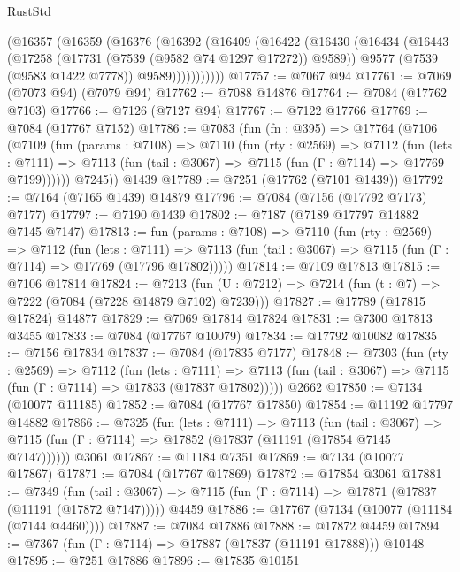 \begin{lexlean}{RustStd}
\begin{coremodule}
        (@16357
          (@16359
            (@16376
              (@16392
                (@16409
                  (@16422
                    (@16430
                      (@16434
                        (@16443
                          (@17258 (@17731 (@7539 (@9582 @74 @1297 @17272)) @9589))
                          @9577
                          (@7539 (@9583 @1422 @7778))
                          @9589)))))))))))
@17757 := @7067 @94
@17761 := @7069 (@7073 @94) (@7079 @94)
@17762 := @7088 @14876
@17764 := @7084 (@17762 @7103)
@17766 := @7126 (@7127 @94)
@17767 := @7122 @17766
@17769 := @7084 (@17767 @7152)
@17786 := @7083
    (fun (fn : @395) =>
    @17764
      (@7106
        (@7109
          (fun (params : @7108) =>
          @7110
            (fun (rty : @2569) =>
            @7112
              (fun (lets : @7111) =>
              @7113 (fun (tail : @3067) => @7115 (fun (Γ : @7114) => @17769 @7199))))))
        @7245))
    @1439
@17789 := @7251 (@17762 (@7101 @1439))
@17792 := @7164 (@7165 @1439) @14879
@17796 := @7084 (@7156 (@17792 @7173) @7177)
@17797 := @7190 @1439
@17802 := @7187 (@7189 @17797 @14882 @7145 @7147)
@17813 := fun (params : @7108) =>
  @7110
    (fun (rty : @2569) =>
    @7112
      (fun (lets : @7111) =>
      @7113 (fun (tail : @3067) => @7115 (fun (Γ : @7114) => @17769 (@17796 @17802)))))
@17814 := @7109 @17813
@17815 := @7106 @17814
@17824 := @7213
    (fun (U : @7212) => @7214 (fun (t : @7) => @7222 (@7084 (@7228 @14879 @7102) @7239)))
@17827 := @17789 (@17815 @17824) @14877
@17829 := @7069 @17814 @17824
@17831 := @7300 @17813 @3455
@17833 := @7084 (@17767 @10079)
@17834 := @17792 @10082
@17835 := @7156 @17834
@17837 := @7084 (@17835 @7177)
@17848 := @7303
    (fun (rty : @2569) =>
    @7112
      (fun (lets : @7111) =>
      @7113 (fun (tail : @3067) => @7115 (fun (Γ : @7114) => @17833 (@17837 @17802)))))
    @2662
@17850 := @7134 (@10077 @11185)
@17852 := @7084 (@17767 @17850)
@17854 := @11192 @17797 @14882
@17866 := @7325
    (fun (lets : @7111) =>
    @7113
      (fun (tail : @3067) =>
      @7115 (fun (Γ : @7114) => @17852 (@17837 (@11191 (@17854 @7145 @7147))))))
    @3061
@17867 := @11184 @7351
@17869 := @7134 (@10077 @17867)
@17871 := @7084 (@17767 @17869)
@17872 := @17854 @3061
@17881 := @7349
    (fun (tail : @3067) => @7115 (fun (Γ : @7114) => @17871 (@17837 (@11191 (@17872 @7147)))))
    @4459
@17886 := @17767 (@7134 (@10077 (@11184 (@7144 @4460))))
@17887 := @7084 @17886
@17888 := @17872 @4459
@17894 := @7367 (fun (Γ : @7114) => @17887 (@17837 (@11191 @17888))) @10148
@17895 := @7251 @17886
@17896 := @17835 @10151

\end{coremodule}
\end{lexlean}
